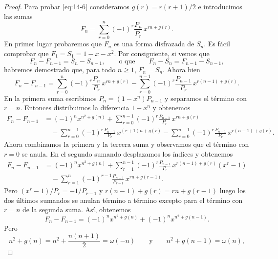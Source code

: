\begin{proof}
        Para probar \eqref{eq:14-6} consideramos $g(r)=r(r+1)/2$ e introducimos las sumas
        \begin{equation*}
            F_n=\sum_{r=0}^{n}(-1)^r\frac{P_n}{P_r}\,x^{rn+g(r)}.
        \end{equation*}
        En primer lugar probaremos que $F_n$ es una forma disfrazada de $S_n$. Es fácil
        comprobar que $F_1=S_1=1-x-x^2$. Por consiguiente, si vemos que
        \begin{equation*}
            F_n-F_{n-1}=S_n-S_{n-1},\qquad\text{o que}\qquad F_n-S_n=F_{n-1}-S_{n-1},
        \end{equation*}
        habremos demostrado que, para todo $n\geq1$, $F_n=S_n$. Ahora bien
        \begin{equation*}
            F_n-F_{n-1}=\sum_{r=0}^{n}(-1)^r\frac{P_n}{P_r}\,x^{rn+g(r)}-\sum_{r=0}^{n-1}(-1)^r\frac{P_{n-1}}{P_r}\,x^{r(n-1)+g(r)}.
        \end{equation*}
        En la primera suma escribimos $P_n=(1-x^n)P_{n-1}$ y separamos el término con $r=n$.
        Entonces distribuimos la diferencia $1-x^n$ y obtenemos
        \begin{align*}
            F_n-F_{n-1}&=(-1)^nx^{n^2+g(n)}+\sum_{r=0}^{n-1}(-1)^r\frac{P_{n-1}}{P_r}\,x^{rn+g(r)}\\
            &\quad-\sum_{r=0}^{n-1}(-1)^r\frac{P_{n-1}}{P_r}\,x^{(r+1)n+g(r)}-\sum_{r=0}^{n-1}(-1)^r\frac{P_{n-1}}{P_r}\,x^{r(n-1)+g(r)}.
        \end{align*}
        Ahora combinamos la primera y la tercera suma y observamos que el término con $r=0$ se
        anula. En el segundo sumando desplazamos los índices y obtenemos
        \begin{align*}
            F_n-F_{n-1}&=(-1)^nx^{n^2+g(n)}+\sum_{r=1}^{n-1}(-1)^r\frac{P_{n-1}}{P_r}\,x^{r(n-1)+g(r)}(x^r-1)\\
            &\quad-\sum_{r=1}^{n}(-1)^{r-1}\frac{P_{n-1}}{P_{r-1}}\,x^{rn+g(r-1)}.
        \end{align*}
        Pero $(x^r-1)/P_r=-1/P_{r-1}$ y $r(n-1)+g(r)=rn+g(r-1)$ luego los dos últimos sumandos
        se anulan término a término excepto para el término con $r=n$ de la segunda suma. Así,
        obtenemos
        \begin{equation*}
            F_n-F_{n-1}=(-1)^nx^{n^2+g(n)}+(-1)^nx^{n^2+g(n-1)}.
        \end{equation*}
        Pero
        \begin{equation*}
            n^2+g(n)=n^2+\frac{n(n+1)}{2}=\omega(-n)\qquad\text{y}\qquad n^2+g(n-1)=\omega(n),

\end{equation*}
\end{proof}
